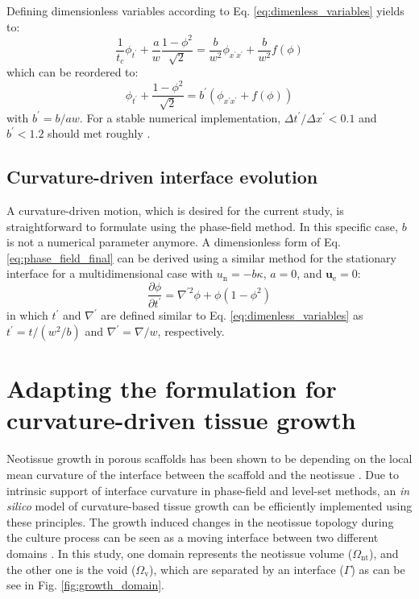 Defining dimensionless variables according to Eq. \ref{eq:dimenless_variables} yields to:
\begin{equation}
\frac{1}{t_c}\phi_{t^{\prime}}+\frac{a}{w} \frac{1-\phi^{2}}{\sqrt{2}}=\frac{b}{w^2} \phi_{x^{\prime}x^{\prime}} + \frac{b}{w^{2}}f(\phi)
\end{equation}
which can be reordered to:
\begin{equation}
\phi_{t^{\prime}}+\frac{1-\phi^{2}}{\sqrt{2}}=b^{\prime}\left( \phi_{x^{\prime}x^{\prime}} + f(\phi)\right)
\end{equation}
with $b^{\prime}=b/aw$. For a stable numerical implementation, $\Delta t^{\prime}/\Delta x^{\prime} < 0.1$ and $b^{\prime} < 1.2$ should met roughly \cite{Sun2007}.


\subsection{Curvature-driven interface evolution}

A curvature-driven motion, which is desired for the current study, is straightforward to formulate using the phase-field method. In this specific case, $b$ is not a numerical parameter anymore. A dimensionless form of Eq. \ref{eq:phase_field_final} can be derived using a similar method for the stationary interface for a multidimensional case with $u_{\mathrm{n}}=-b\kappa$, $a=0$, and $\boldsymbol{u}_{\mathrm{e}}=0$:
\begin{equation} \label{eq:pf_curvature}
\frac{\partial \phi}{\partial t^{\prime}}=\nabla^{\prime 2} \phi+\phi\left(1-\phi^{2}\right)
\end{equation}
in which $t^{\prime}$ and $\nabla^{\prime}$ are defined similar to Eq. \ref{eq:dimenless_variables} as $t^{\prime}=t/(w^2/b)$ and $\nabla^{\prime}=\nabla/w$, respectively.

\section{Adapting the formulation for  curvature-driven tissue growth}

Neotissue growth in porous scaffolds has been shown to be depending on the local mean curvature of the interface between the scaffold and the neotissue \cite{Bidan2012, Bidan2012a, Rumpler2008}. Due to intrinsic support of interface curvature in phase-field and level-set methods, an \textit{in silico} model of curvature-based tissue growth can be efficiently implemented using these principles. The growth induced changes in the neotissue topology during the culture process can be seen as a moving interface between two different domains \cite{Rumpler2008}. In this study, one domain represents the neotissue volume  ($\Omega_{\text{nt}}$), and the other one is the void ($\Omega_{\text{v}}$), which are separated by an interface ($\Gamma$) as can be see in Fig. \ref{fig:growth_domain}.

